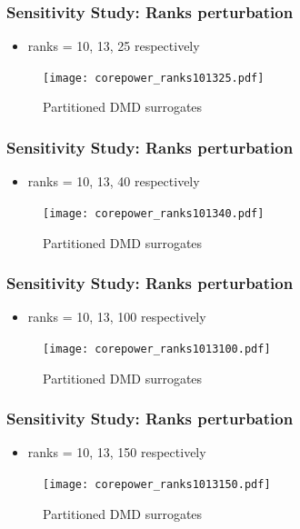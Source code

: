 \documentclass[fleqn]{beamer}
\begin{document}
\begin{frame}
\frametitle{Sensitivity Study: Ranks perturbation}
\begin{itemize}
 \item ranks = 10, 13, 25 respectively
\end{itemize}
\begin{figure}[ht]
\texttt{[image: corepower\_ranks101325.pdf]}
\caption{Partitioned DMD surrogates}
\end{figure}
\end{frame}

\begin{frame}
\frametitle{Sensitivity Study: Ranks perturbation}
\begin{itemize}
 \item ranks = 10, 13, 40 respectively
\end{itemize}
\begin{figure}[ht]
\texttt{[image: corepower\_ranks101340.pdf]}
\caption{Partitioned DMD surrogates}
\end{figure}
\end{frame}

\begin{frame}
\frametitle{Sensitivity Study: Ranks perturbation}
\begin{itemize}
 \item ranks = 10, 13, 100 respectively
\end{itemize}
\begin{figure}[ht]
\texttt{[image: corepower\_ranks1013100.pdf]}
\caption{Partitioned DMD surrogates}
\end{figure}
\end{frame}

\begin{frame}
\frametitle{Sensitivity Study: Ranks perturbation}
\begin{itemize}
 \item ranks = 10, 13, 150 respectively
\end{itemize}
\begin{figure}[ht]
\texttt{[image: corepower\_ranks1013150.pdf]}
\caption{Partitioned DMD surrogates}
\end{figure}
\end{frame}
  
\end{document}
